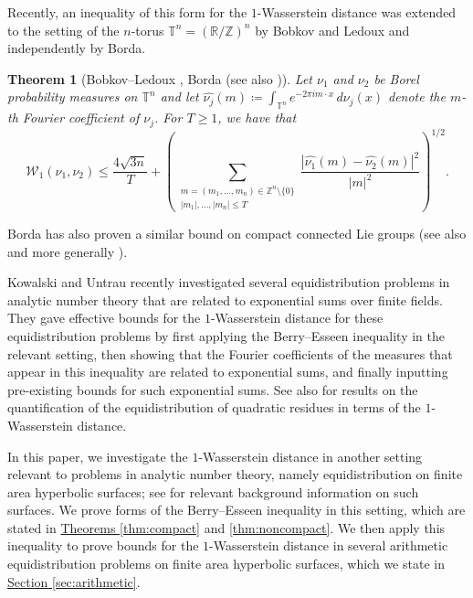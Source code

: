 \documentclass[11pt,a4paper]{amsart}
\newcommand{\R}{\mathbb{R}}
\newcommand{\T}{\mathbb{T}}
\newcommand{\Wscr}{\mathscr{W}}
\newcommand{\Z}{\mathbb{Z}}
\numberwithin{equation}{section}
\newtheorem{theorem}[equation]{Theorem}
\theoremstyle{remark}
\theoremstyle{definition}
\begin{document}
Recently, an inequality of this form for the $1$-Wasserstein distance was extended to the setting of the $n$-torus $\T^n = (\R/\Z)^n$ by Bobkov and Ledoux and independently by Borda.

\begin{theorem}[{Bobkov--Ledoux \cite[Proposition 2]{BL21}, Borda \cite[Proposition 3]{Bor21a} (see also \cite[Theorem 1.2 (7)]{KU25})}]
\label{thm:BobkovLedoux}
Let $\nu_1$ and $\nu_2$ be Borel probability measures on $\T^n$ and let $\widehat{\nu_j}(m) \coloneqq \int_{\T^n} e^{-2\pi i m \cdot x} \, d\nu_j(x)$ denote the $m$-th Fourier coefficient of $\nu_j$. For $T \geq 1$, we have that
\[\Wscr_1(\nu_1,\nu_2) \leq \frac{4\sqrt{3n}}{T} + \left(\sum_{\substack{m = (m_1,\ldots,m_n) \in \Z^n \setminus \{0\} \\ |m_1|,\ldots,|m_n| \leq T}} \frac{\left|\widehat{\nu_1}(m) - \widehat{\nu_2}(m)\right|^2}{|m|^2}\right)^{1/2}.\]
\end{theorem}

Borda has also proven a similar bound on compact connected Lie groups \cite[Theorem 1]{Bor21b} (see also \cite[Theorem 4.1]{KU25} and more generally \cite[Theorem 4]{BC25}).

Kowalski and Untrau \cite{KU25} recently investigated several equidistribution problems in analytic number theory that are related to exponential sums over finite fields. They gave effective bounds for the $1$-Wasserstein distance for these equidistribution problems by first applying the Berry--Esseen inequality in the relevant setting, then showing that the Fourier coefficients of the measures that appear in this inequality are related to exponential sums, and finally inputting pre-existing bounds for such exponential sums. See also \cite{Gra20,Stei21} for results on the quantification of the equidistribution of quadratic residues in terms of the $1$-Wasserstein distance.

In this paper, we investigate the $1$-Wasserstein distance in another setting relevant to problems in analytic number theory, namely equidistribution on finite area hyperbolic surfaces; see \cite[Chapters 1 and 2]{Iwa02} for relevant background information on such surfaces. We prove forms of the Berry--Esseen inequality in this setting, which are stated in \hyperref[thm:compact]{Theorems \ref*{thm:compact}} and \ref{thm:noncompact}. We then apply this inequality to prove bounds for the $1$-Wasserstein distance in several arithmetic equidistribution problems on finite area hyperbolic surfaces, which we state in \hyperref[sec:arithmetic]{Section \ref*{sec:arithmetic}}.
\end{document}
